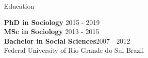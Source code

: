 \begin{rSection}{Education}

{\bf PhD in Sociology} \hfill {2015 - 2019} \\
{\bf MSc in Sociology} \hfill {2013 - 2015} \\
{\bf Bachelor in Social Sciences}\hfill {2007 - 2012}\\
{Federal University of Rio Grande do Sul} \hfill { Brazil}

\end{rSection}